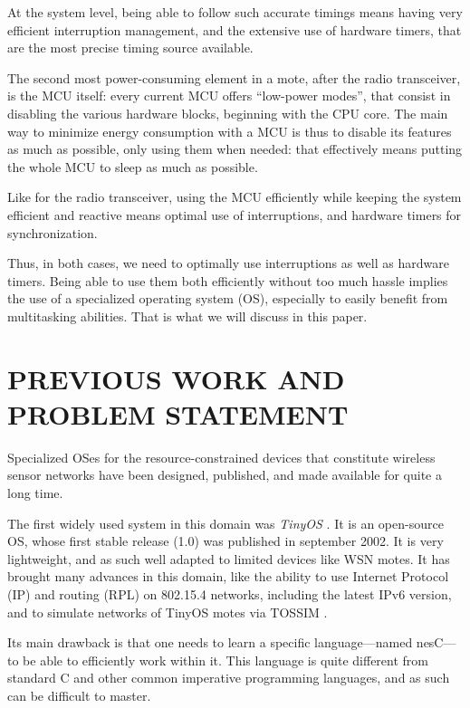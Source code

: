 \documentclass[a4paper,twoside]{article}
\begin{document}
At the system level, being able to follow such accurate timings means having
very efficient interruption management, and the extensive use of hardware
timers, that are the most precise timing source available.

The second most power-consuming element in a mote, after the radio
transceiver, is the MCU itself: every current MCU offers ``low-power modes'',
that consist in disabling the various hardware blocks, beginning with the CPU
core. The main way to minimize energy consumption with a MCU is thus
to disable its features as much as possible, only using them when needed:
that effectively means putting the whole MCU to sleep as much as possible.

Like for the radio transceiver, using the MCU efficiently while keeping
the system efficient and reactive means optimal use of interruptions,
and hardware timers for synchronization.

Thus, in both cases, we need to optimally use interruptions as well as
hardware timers. Being able to use them both efficiently without too much
hassle implies the use of a specialized operating system (OS), especially
to easily benefit from multitasking abilities. That is what we will
discuss in this paper.


\section{\uppercase{Previous work and problem statement}}

Specialized OSes for the resource-constrained devices that constitute
wireless sensor networks have been designed, published, and made available
for quite a long time.


The first widely used system in this domain was \emph{TinyOS} \cite{TinyOS}.
It is an open-source OS, whose first stable release (1.0) was published in
september 2002. It is very lightweight, and as such well adapted to limited
devices like WSN motes.  It has brought many advances in this domain, like
the ability to use Internet Protocol (IP) and routing (RPL) on 802.15.4
networks, including the latest IPv6 version, and to simulate networks
of TinyOS motes via TOSSIM \cite{TOSSIM}.

Its main drawback is that one needs to learn a specific language---named
nesC---to be able to efficiently work within it. This language is quite
different from standard C and other common imperative programming languages,
and as such can be difficult to master.
\end{document}
